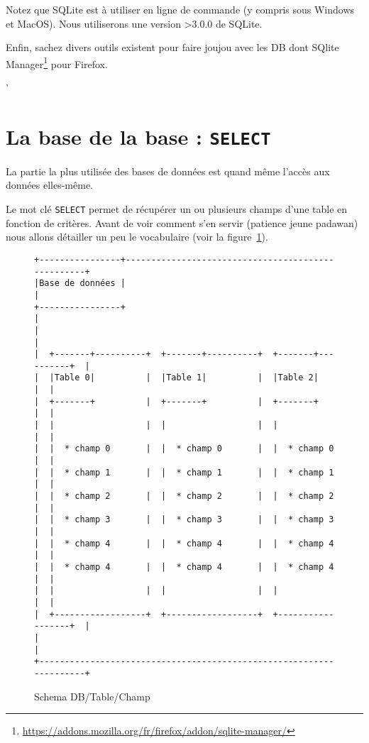 \documentclass[a4paper, 11pt]{report}
\newcommand\http[1]{\footnote{\url{#1}}}
\begin{document}
Notez que SQLite est à utiliser en ligne de commande (y compris sous Windows et MacOS).
Nous utiliserons une version >3.0.0 de SQLite.

Enfin, sachez divers outils existent pour faire joujou avec les DB dont SQlite Manager\http{https://addons.mozilla.org/fr/firefox/addon/sqlite-manager/} pour Firefox.

'%
\section{La base de la base : \texttt{SELECT}}

La partie la plus utilisée des bases de données est quand même l'accès aux données elles-même.

Le mot clé \texttt{SELECT} permet de récupérer un ou plusieurs champs d'une table en fonction de critères.
Avant de voir comment s'en servir (patience jeune padawan) nous allons détailler un peu le vocabulaire (voir la figure~\ref{schemaDB}).

\begin{figure}[!t]
\begin{verbatim}
+----------------+---------------------------------------------------+
|Base de données |                                                   |
+----------------+                                                   |
|                                                                    |
|  +-------+----------+  +-------+----------+  +-------+----------+  |
|  |Table 0|          |  |Table 1|          |  |Table 2|          |  |
|  +-------+          |  +-------+          |  +-------+          |  |
|  |                  |  |                  |  |                  |  |
|  |  * champ 0       |  |  * champ 0       |  |  * champ 0       |  |
|  |  * champ 1       |  |  * champ 1       |  |  * champ 1       |  |
|  |  * champ 2       |  |  * champ 2       |  |  * champ 2       |  |
|  |  * champ 3       |  |  * champ 3       |  |  * champ 3       |  |
|  |  * champ 4       |  |  * champ 4       |  |  * champ 4       |  |
|  |  * champ 4       |  |  * champ 4       |  |  * champ 4       |  |
|  |                  |  |                  |  |                  |  |
|  +------------------+  +------------------+  +------------------+  |
|                                                                    |
+--------------------------------------------------------------------+
\end{verbatim}
\caption{Schema DB/Table/Champ}
\label{schemaDB}
\end{figure}
\end{document}
